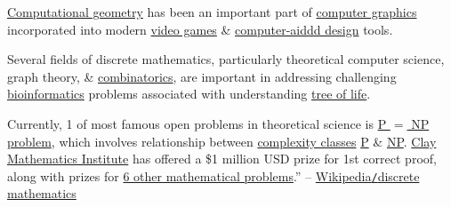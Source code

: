 \documentclass{article}
\begin{document}
\href{https://en.wikipedia.org/wiki/Computational_geometry}{Computational geometry} has been an important part of \href{https://en.wikipedia.org/wiki/Computer_graphics_(computer_science)}{computer graphics} incorporated into modern \href{https://en.wikipedia.org/wiki/Video_game}{video games} \& \href{https://en.wikipedia.org/wiki/Computer-aided_design}{computer-aiddd design} tools.

Several fields of discrete mathematics, particularly theoretical computer science, graph theory, \& \href{https://en.wikipedia.org/wiki/Combinatorics}{combinatorics}, are important in addressing challenging \href{https://en.wikipedia.org/wiki/Bioinformatics}{bioinformatics} problems associated with understanding \href{https://en.wikipedia.org/wiki/Phylogenetic_tree}{tree of life}.

Currently, 1 of most famous open problems in theoretical science is \href{https://en.wikipedia.org/wiki/P_%3D_NP_problem}{P $=$ NP problem}, which involves relationship between \href{https://en.wikipedia.org/wiki/Complexity_class}{complexity classes} \href{https://en.wikipedia.org/wiki/P_(complexity)}{P} \& \href{https://en.wikipedia.org/wiki/NP_(complexity)}{NP}. \href{https://en.wikipedia.org/wiki/Clay_Mathematics_Institute}{Clay Mathematics Institute} has offered a \$1 million USD prize for 1st correct proof, along with prizes for \href{https://en.wikipedia.org/wiki/Millennium_Prize_Problems}{6 other mathematical problems}.'' -- \href{https://en.wikipedia.org/wiki/Discrete_mathematics}{Wikipedia{\tt/}discrete mathematics}


\printbibliography[heading=bibintoc]
	
\end{document}

